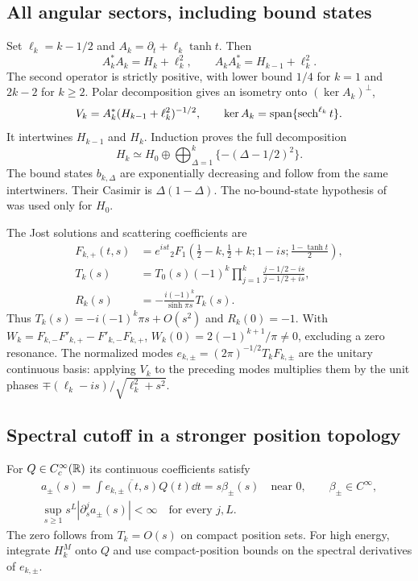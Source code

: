 \subsection{All angular sectors, including bound states}
Set $\ell_k=k-1/2$ and $A_k=\partial_t+\ell_k\tanh t$. Then
\begin{equation}
 A_k^*A_k=H_k+\ell_k^2,\qquad
 A_kA_k^*=H_{k-1}+\ell_k^2.
\end{equation}
The second operator is strictly positive, with lower bound $1/4$ for
$k=1$ and $2k-2$ for $k\ge2$. Polar decomposition gives an isometry onto
$(\ker A_k)^\perp$,
\begin{equation}
 V_k=A_k^*(H_{k-1}+\ell_k^2)^{-1/2},\qquad
 \ker A_k=\operatorname{span}\{\operatorname{sech}^{\ell_k}t\}.
\end{equation}
It intertwines $H_{k-1}$ and $H_k$. Induction proves the full decomposition
\begin{equation}
 H_k\simeq H_0\oplus\bigoplus_{\Delta=1}^k\{-(\Delta-1/2)^2\}.
 \label{eq:darboux-spectrum}
\end{equation}
The bound states $b_{k,\Delta}$ are exponentially decreasing and follow
from the same intertwiners. Their Casimir is $\Delta(1-\Delta)$.
The no-bound-state hypothesis of~\cite{GPR} was used only for $H_0$.

The Jost solutions and scattering coefficients are
\begin{align}
 F_{k,+}(t,s)&=e^{ist}{}_2F_1\left(\tfrac12-k,\tfrac12+k;1-is;
                         \tfrac{1-\tanh t}{2}\right),\\
 T_k(s)&=T_0(s)(-1)^k\prod_{j=1}^k\frac{j-1/2-is}{j-1/2+is},\\
 R_k(s)&=-\frac{i(-1)^k}{\sinh\pi s}T_k(s).
 \label{eq:full-scattering}
\end{align}
Thus $T_k(s)=-i(-1)^k\pi s+O(s^2)$ and $R_k(0)=-1$.
With $W_k=F_{k,-}F'_{k,+}-F'_{k,-}F_{k,+}$,
$W_k(0)=2(-1)^{k+1}/\pi\ne0$, excluding a zero resonance.
The normalized modes $e_{k,\pm}=(2\pi)^{-1/2}T_kF_{k,\pm}$ are the
unitary continuous basis: applying $V_k$ to the preceding modes multiplies
them by the unit phases $\mp(\ell_k-is)/\sqrt{\ell_k^2+s^2}$.

\subsection{Spectral cutoff in a stronger position topology}
For $Q\in C_c^\infty(\mathbb R)$ its continuous coefficients satisfy
\begin{equation}
 \begin{gathered}
 a_\pm(s)=\int\overline{e_{k,\pm}(t,s)}Q(t)\dd t
          =s\beta_\pm(s)\quad\text{near }0,\qquad \beta_\pm\in C^\infty,\\
 \sup_{s\ge1}s^L|\partial_s^ja_\pm(s)|<\infty
       \quad\text{for every }j,L.
 \end{gathered}
 \label{eq:spectral-endpoints}
\end{equation}
The zero follows from $T_k=O(s)$ on compact position sets. For high
energy, integrate $H_k^M$ onto $Q$ and use compact-position bounds on the
spectral derivatives of $e_{k,\pm}$.

